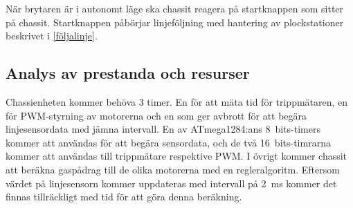 När brytaren är i autonomt läge ska chassit reagera på startknappen som sitter på chassit. Startknappen påbörjar linjeföljning med hantering av plockstationer beskrivet i \ref{följalinje}.

\subsection{Analys av prestanda och resurser}

Chassienheten kommer behöva 3 timer. En för att mäta tid för trippmätaren, en för PWM-styrning av motorerna och en som ger avbrott för att begära linjesensordata med jämna intervall. En av ATmega1284:ans 8~bits-timers kommer att användas för att begära sensordata, och de två 16~bits-timrarna kommer att användas till trippmätare respektive PWM. I övrigt kommer chassit att beräkna gaspådrag till de olika motorerna med en regleralgoritm. Eftersom värdet på linjesensorn kommer uppdateras med intervall på 2~ms kommer det finnas tillräckligt med tid för att göra denna beräkning.